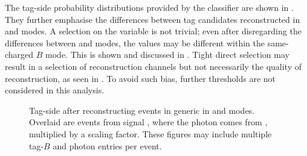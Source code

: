 The tag-side probability distributions provided by the \FEI classifier are shown in .
They further emphasise the differences between tag candidates reconstructed in \feiBp and \feiBz modes.
A selection on the \feiProb variable is not trivial;
even after disregarding the differences between \feiBp and \feiBz modes, 
the \feiProb values may be different within the same-charged $B$ mode.
This is shown and discussed in .
Tight direct selection may result in a selection of reconstruction channels but not necessarily the quality of reconstruction, as seen in .
To avoid such bias, further \feiProb thresholds are not considered in this analysis.

\begin{figure}[hbtp!]
    \centering
    \caption{\label{fig:sigprob_after_reco} Tag-side \feiProb after reconstructing \BtoXsgamma events in generic \MC in \feiBp and \feiBz modes.
    Overlaid are events from signal \MC, where the photon comes from \BtoXsgamma, multiplied by a scaling factor.
    These figures may include multiple tag-$B$ and photon entries per event.
    }
\end{figure}

